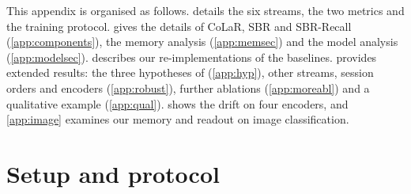 






\noindent This appendix is organised as follows.  details the six streams, the two metrics and the training protocol.  gives the details of CoLaR, SBR and SBR-Recall (\cref{app:components}), the memory analysis (\cref{app:memsec}) and the model analysis (\cref{app:modelsec}).  describes our re-implementations of the baselines.  provides extended results: the three hypotheses of  (\cref{app:hyp}), other streams, session orders and encoders (\cref{app:robust}), further ablations (\cref{app:moreabl}) and a qualitative example (\cref{app:qual}).  shows the drift on four encoders, and \cref{app:image} examines our memory and readout on image classification.

\section{Setup and protocol}
\label{app:setup}
\begin{table}[t]
\centering\scriptsize
\setlength{\tabcolsep}{2.5pt}
\caption{\textbf{Benchmark settings}: six streams over five document datasets. Train/test documents: FUNSD 149/50, SROIE 626/347, CORD 800/100. DIL-XFUND: German, Spanish, French, Italian and Chinese. AA: mean F1 of the final model over the sessions; full-label F1: on the unmasked test set of the stream's dataset ().}
\label{tab:bench}

\end{table}

